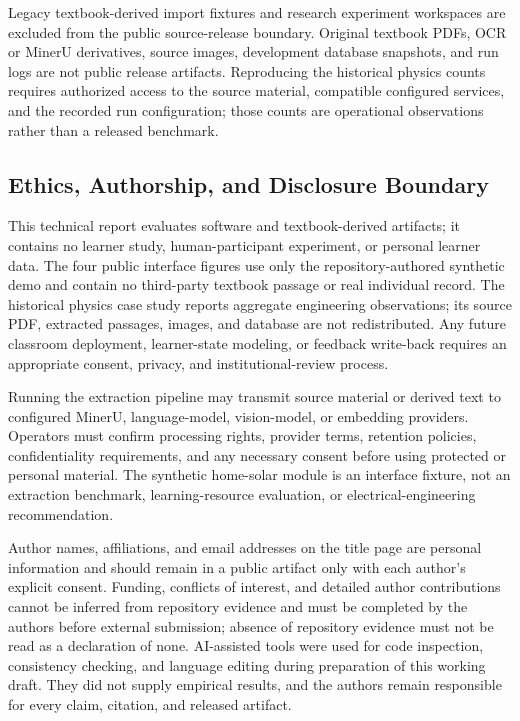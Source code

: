 \documentclass[11pt,letterpaper]{article}
\begin{document}
Legacy textbook-derived import fixtures and research experiment workspaces are excluded from the public source-release boundary. Original textbook PDFs, OCR or MinerU derivatives, source images, development database snapshots, and run logs are not public release artifacts. Reproducing the historical physics counts requires authorized access to the source material, compatible configured services, and the recorded run configuration; those counts are operational observations rather than a released benchmark.

\subsection{Ethics, Authorship, and Disclosure Boundary}

This technical report evaluates software and textbook-derived artifacts; it contains no learner study, human-participant experiment, or personal learner data. The four public interface figures use only the repository-authored synthetic demo and contain no third-party textbook passage or real individual record. The historical physics case study reports aggregate engineering observations; its source PDF, extracted passages, images, and database are not redistributed. Any future classroom deployment, learner-state modeling, or feedback write-back requires an appropriate consent, privacy, and institutional-review process.

Running the extraction pipeline may transmit source material or derived text to configured MinerU, language-model, vision-model, or embedding providers. Operators must confirm processing rights, provider terms, retention policies, confidentiality requirements, and any necessary consent before using protected or personal material. The synthetic home-solar module is an interface fixture, not an extraction benchmark, learning-resource evaluation, or electrical-engineering recommendation.

Author names, affiliations, and email addresses on the title page are personal information and should remain in a public artifact only with each author's explicit consent. Funding, conflicts of interest, and detailed author contributions cannot be inferred from repository evidence and must be completed by the authors before external submission; absence of repository evidence must not be read as a declaration of none. AI-assisted tools were used for code inspection, consistency checking, and language editing during preparation of this working draft. They did not supply empirical results, and the authors remain responsible for every claim, citation, and released artifact.
\end{document}
